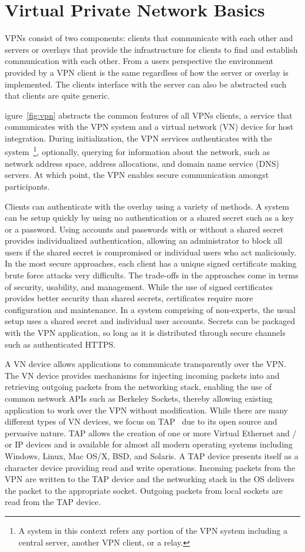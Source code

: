 \section{Virtual Private Network Basics}
VPNs consist of two components: clients that communicate with each other and
servers or overlays that provide the infrastructure for clients to find and
establish communication with each other.  From a users perspective the
environment provided by a VPN client is the same regardless of how the server
or overlay is implemented.  The clients interface with the server can also
be abstracted such that clients are quite generic.

igure~\ref{fig:vpn} abstracts the common features of all VPNs clients, a
service that communicates with the VPN system and a virtual network (VN) device
for host integration.  During initialization, the VPN services authenticates
with the system~\footnote{A system in this context refers any portion of the
VPN system including a central server, another VPN client, or a relay.},
optionally, querying for information about the network, such as network address
space, address allocations, and domain name service (DNS) servers.  At which
point, the VPN enables secure communication amongst participants.

Clients can authenticate with the overlay using a variety of methods.  A system
can be setup quickly by using no authentication or a shared secret such as a key
or a password.  Using accounts and passwords with or without a shared secret
provides individualized authentication, allowing an administrator to block all
users if the shared secret is compromised or individual users who act
maliciously.  In the most secure approaches, each client has a unique signed
certificate making brute force attacks very difficults.  The trade-offs in the
approaches come in terms of security, usability, and management.  While the use
of signed certificates provides better security than shared secrets,
certificates require more configuration and maintenance.  In a system comprising
of non-experts, the usual setup uses a shared secret and individual user
accounts.  Secrets can be packaged with the VPN application, so long as it is
distributed through secure channels such as authenticated HTTPS.

A VN device allows applications to communicate transparently over the VPN.  The
VN device provides mechanisms for injecting incoming packets into and retrieving
outgoing packets from the networking stack, enabling the use of common network
APIs such as Berkeley Sockets, thereby allowing existing application to work over
the VPN without modification.  While there are many different types of VN
devices, we focus on TAP~\cite{tap} due to its open source and pervasive nature.
TAP allows the creation of one or more Virtual Ethernet and / or IP devices and
is available for almost all modern operating systems including Windows, Linux,
Mac OS/X, BSD, and Solaris.  A TAP device presents itself as a character device
providing read and write operations.  Incoming packets from the VPN are written
to the TAP device and the networking stack in the OS delivers the packet to the
appropriate socket.  Outgoing packets from local sockets are read from the TAP
device.

